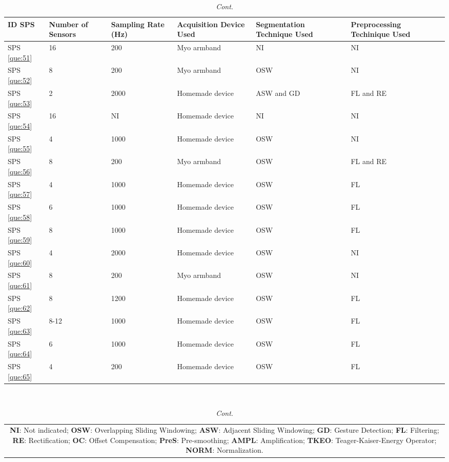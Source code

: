 \documentclass[sensors,review,accept,moreauthors,pdftex]{Definitions/mdpi}
\begin{document}
	\begin{table}[H]\ContinuedFloat
	\centering
\caption{\textit{Cont}.}
\begin{tabular}{m{30pt}m{44pt}m{40pt}m{113pt}m{67pt}m{70pt}}
	\toprule
	\textbf{ID SPS}&\textbf{Number of Sensors}&\textbf{Sampling Rate (Hz)}&\textbf{Acquisition Device Used}&\textbf{Segmentation Technique Used}&\textbf{Preprocessing Techinique Used}\\
	\midrule
	
	SPS \ref{que:51}	&	16	&	200	&	Myo armband&	NI	&	NI	\\	
	SPS \ref{que:52}	&	8	&	200	&	Myo armband	&	OSW	&	NI	\\	
	SPS \ref{que:53}	&	2	&	2000	&	Homemade device	&	ASW and GD	&	FL and RE\\	
	SPS \ref{que:54}	&	16	&	NI	&	Homemade device	&	NI	&	NI	\\	
	SPS \ref{que:55}	&	4	&	1000	&	Homemade device &	OSW	&	NI	\\	
	SPS \ref{que:56}	&	8	&	200	&	Myo armband	&	OSW	&	FL and RE	\\	
	
	SPS \ref{que:57}&	4	&	1000	&	Homemade device	&	OSW	&	FL	\\	
	SPS \ref{que:58}&	6	&	1000	&	Homemade device	&	OSW	&	FL	\\	
	SPS \ref{que:59}&	8	&	1000	&	Homemade device	&	OSW	&	FL	\\	
	SPS \ref{que:60}&	4	&	2000	&	Homemade device	&	OSW	&	NI	\\	
	SPS \ref{que:61}&	8	&	200	&	Myo armband	&	OSW	&	NI	\\	
	SPS \ref{que:62}&	8	&	1200	&	Homemade device	&	OSW	&	FL	\\	
	SPS \ref{que:63}&	8-12	&	1000	&	Homemade device	&	OSW	&	FL	\\	
	SPS \ref{que:64}&	6	&	1000	&	Homemade device	&	OSW	&	FL	\\	
	SPS \ref{que:65}&	4	&	200	&	Homemade device	&	OSW	&	FL	\\	
	
		\bottomrule
	\end{tabular}\\
\begin{tabular}{@{}c@{}} 
\multicolumn{1}{p{\textwidth -.88in}}{\footnotesize  \textbf{NI}: Not indicated; \textbf{OSW}: Overlapping Sliding Windowing; \textbf{ASW}: Adjacent Sliding Windowing; \textbf{GD}: Gesture Detection;   \textbf{FL}: Filtering;  \textbf{RE}: Rectification; \textbf{OC}: Offset Compensation; \textbf{PreS}: Pre-smoothing; \textbf{AMPL}: Amplification;  \textbf{TKEO}: Teager-Kaiser-Energy Operator; \textbf{NORM}: Normalization.}
\end{tabular}
		
		
%		
%		
%	
%		
%		
%		
%
%	
\end{table}
\end{document}
